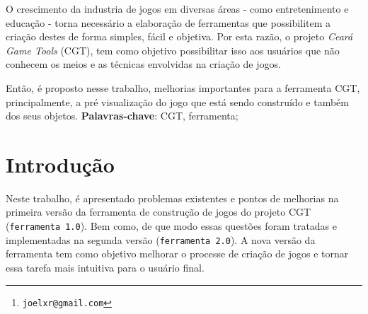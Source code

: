 \documentclass[12pt,twoside,openright,a4paper,english,brazil,sumario=tradicional]{abntex2}
\author{Joel Xavier Rocha\thanks{\texttt{joelxr@gmail.com}}}
\begin{document}
\frenchspacing
\imprimircapa
\imprimirfolhaderosto*

%     

% 

\begin{agradecimentos}

\end{agradecimentos}
\setlength{\absparsep}{18pt}
\begin{resumo}
   O crescimento da industria de jogos em diversas áreas - como entretenimento e educação - torna necessário a elaboração de ferramentas que possibilitem a criação destes de forma simples, fácil e objetiva. Por esta razão, o projeto \emph{Ceará Game Tools} (CGT), tem como objetivo possibilitar isso aos usuários que não conhecem os meios e as técnicas envolvidas na criação de jogos.

   Então, é proposto nesse trabalho, melhorias importantes para a ferramenta CGT, principalmente, a pré visualização do jogo que está sendo construído e também dos seus objetos.
   \vspace{\onelineskip}
   \noindent
   \textbf{Palavras-chave}: CGT, ferramenta;
\end{resumo}
\listoffigures*
\cleardoublepage
{}
\listoftables*
\cleardoublepage
{}
\tableofcontents*
\cleardoublepage
\textual
\chapter{Introdução} %
\label{chap:introducao}
Neste trabalho, é apresentado problemas existentes e pontos de melhorias na primeira versão da ferramenta de construção de jogos do projeto CGT (\texttt{ferramenta 1.0}). Bem como, de que modo essas questões foram tratadas e implementadas na segunda versão (\texttt{ferramenta 2.0}). A nova versão da ferramenta tem como objetivo melhorar o processe de criação de jogos e tornar essa tarefa mais intuitiva para o usuário final.
\end{document}
